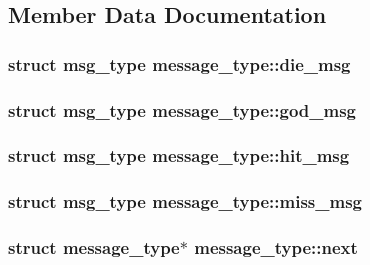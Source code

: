 \subsection{Member Data Documentation}
\hypertarget{structmessage__type_a80133b1d5675854fbf911df074e17290}{
\subsubsection[{die\-\_\-msg}]{\setlength{\rightskip}{0pt plus 5cm}struct {\bf msg\-\_\-type} message\-\_\-type\-::die\-\_\-msg}}\label{structmessage__type_a80133b1d5675854fbf911df074e17290}
\hypertarget{structmessage__type_ac5ad50968cab26b2471918bef0af98e8}{
\subsubsection[{god\-\_\-msg}]{\setlength{\rightskip}{0pt plus 5cm}struct {\bf msg\-\_\-type} message\-\_\-type\-::god\-\_\-msg}}\label{structmessage__type_ac5ad50968cab26b2471918bef0af98e8}
\hypertarget{structmessage__type_ad9bb87d7fe2057fd8fffb7cbcdd7f59c}{
\subsubsection[{hit\-\_\-msg}]{\setlength{\rightskip}{0pt plus 5cm}struct {\bf msg\-\_\-type} message\-\_\-type\-::hit\-\_\-msg}}\label{structmessage__type_ad9bb87d7fe2057fd8fffb7cbcdd7f59c}
\hypertarget{structmessage__type_ad17635689f46c02c4e09f3c38a06a796}{
\subsubsection[{miss\-\_\-msg}]{\setlength{\rightskip}{0pt plus 5cm}struct {\bf msg\-\_\-type} message\-\_\-type\-::miss\-\_\-msg}}\label{structmessage__type_ad17635689f46c02c4e09f3c38a06a796}
\hypertarget{structmessage__type_ab057ca90031d1883592f0437e9ef0db6}{
\subsubsection[{next}]{\setlength{\rightskip}{0pt plus 5cm}struct {\bf message\-\_\-type}$\ast$ message\-\_\-type\-::next}}\label{structmessage__type_ab057ca90031d1883592f0437e9ef0db6}
